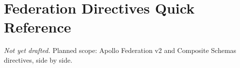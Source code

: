 \chapter{Federation Directives Quick Reference}
\label{app:directives}

\emph{Not yet drafted.} Planned scope: Apollo Federation v2 and Composite Schemas directives, side by side.

